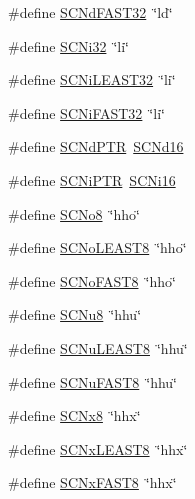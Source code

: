 \begin{DoxyCompactItemize}
\#define \hyperlink{group__avr__inttypes_gadd733be35bef9dcef225edc99ade9e33}{S\+C\+Nd\+F\+A\+S\+T32}~\char`\"{}ld\char`\"{}
\item 
\#define \hyperlink{group__avr__inttypes_ga52cfc41a1e5ad73788faebbfeb9c14b0}{S\+C\+Ni32}~\char`\"{}li\char`\"{}
\item 
\#define \hyperlink{group__avr__inttypes_ga39be8ffb41be80bc951e955f111e4121}{S\+C\+Ni\+L\+E\+A\+S\+T32}~\char`\"{}li\char`\"{}
\item 
\#define \hyperlink{group__avr__inttypes_ga4739f89fa519cd77097677bf33320091}{S\+C\+Ni\+F\+A\+S\+T32}~\char`\"{}li\char`\"{}
\item 
\#define \hyperlink{group__avr__inttypes_gabf657ee6bd4b009b5b072840a3d7364f}{S\+C\+Nd\+P\+TR}~\hyperlink{group__avr__inttypes_ga35974d44b5dcebcb222b8e2c1384241d}{S\+C\+Nd16}
\item 
\#define \hyperlink{group__avr__inttypes_ga9c632ab51b24b93cc315b27a883be9eb}{S\+C\+Ni\+P\+TR}~\hyperlink{group__avr__inttypes_ga7b8508989273ad152f9b3b7cd4db6eee}{S\+C\+Ni16}
\item 
\#define \hyperlink{group__avr__inttypes_ga4e274a339187359a91963d22f8e6faa6}{S\+C\+No8}~\char`\"{}hho\char`\"{}
\item 
\#define \hyperlink{group__avr__inttypes_ga873157069430be3ab2cade457e92f187}{S\+C\+No\+L\+E\+A\+S\+T8}~\char`\"{}hho\char`\"{}
\item 
\#define \hyperlink{group__avr__inttypes_ga9716b5135de22733c9c59bc4fc0e3a66}{S\+C\+No\+F\+A\+S\+T8}~\char`\"{}hho\char`\"{}
\item 
\#define \hyperlink{group__avr__inttypes_gae0d5458bfaf4c45083b1e92013d77f51}{S\+C\+Nu8}~\char`\"{}hhu\char`\"{}
\item 
\#define \hyperlink{group__avr__inttypes_gae409b3af282bc394819a5dd289cdf57c}{S\+C\+Nu\+L\+E\+A\+S\+T8}~\char`\"{}hhu\char`\"{}
\item 
\#define \hyperlink{group__avr__inttypes_ga01b368195aa26130d44bf0efe07833fd}{S\+C\+Nu\+F\+A\+S\+T8}~\char`\"{}hhu\char`\"{}
\item 
\#define \hyperlink{group__avr__inttypes_ga79b1f201c12273510e1fdebfb3a66e9d}{S\+C\+Nx8}~\char`\"{}hhx\char`\"{}
\item 
\#define \hyperlink{group__avr__inttypes_ga5cac5341d60e594c818c0f9d25377928}{S\+C\+Nx\+L\+E\+A\+S\+T8}~\char`\"{}hhx\char`\"{}
\item 
\#define \hyperlink{group__avr__inttypes_ga251936e4d698e68846c0917270b5f8a5}{S\+C\+Nx\+F\+A\+S\+T8}~\char`\"{}hhx\char`\"{}
\item 

\end{DoxyCompactItemize}
